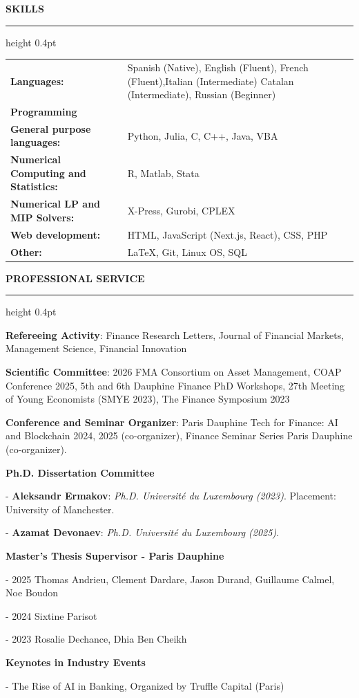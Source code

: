 \documentclass[11pt,letterpaper]{article}
\makeatletter
\newcommand{\cvsection}[1]{%
  \par\vspace{12.80pt}%
  \textbf{#1}\par\nobreak
  \vspace{6.08pt}\hrule height 0.4pt\nobreak\vspace{6.9pt}\nobreak}
\newenvironment{cvbody}
  {\begin{list}{}{%
      \@beginparpenalty\@M      %
      \setlength{\leftmargin}{1.5em}%
      \setlength{\rightmargin}{0pt}%
      \setlength{\labelwidth}{0pt}%
      \setlength{\labelsep}{0pt}%
      \setlength{\listparindent}{0pt}%
      \setlength{\itemindent}{0pt}%
      \setlength{\topsep}{0pt}%
      \setlength{\partopsep}{0pt}%
      \setlength{\parsep}{0pt}%
      \setlength{\itemsep}{0pt}}%
   \item\relax}
  {\end{list}}
\makeatother
\begin{document}
\cvsection{SKILLS}
\begin{cvbody}
\begin{tabular}{@{}p{203pt}@{}p{311pt}@{}}
\textbf{Languages:} & Spanish (Native), English (Fluent), French (Fluent),\newline Italian (Intermediate) Catalan (Intermediate), Russian (Beginner)\\
\textbf{Programming} & \\
\textbf{General purpose languages:} & Python, Julia, C, C++, Java, VBA\\
\textbf{Numerical Computing and Statistics:} & R, Matlab, Stata\\
\textbf{Numerical LP and MIP Solvers:} & X-Press, Gurobi, CPLEX\\
\textbf{Web development:} & HTML, JavaScript (Next.js, React), CSS, PHP\\
\textbf{Other:} & \LaTeX, Git, Linux OS, SQL\\
\end{tabular}
\end{cvbody}

\cvsection{PROFESSIONAL SERVICE}
\begin{cvbody}
\textbf{Refereeing Activity}: Finance Research Letters, Journal of Financial Markets, Management Science, Financial Innovation\par
\textbf{Scientific Committee}: 2026 FMA Consortium on Asset Management, COAP Conference 2025, 5th and 6th Dauphine Finance PhD Workshops, 27th Meeting of Young Economists (SMYE 2023), The Finance Symposium 2023\par
\textbf{Conference and Seminar Organizer}: Paris Dauphine Tech for Finance: AI and Blockchain 2024, 2025 (co-organizer), Finance Seminar Series Paris Dauphine (co-organizer).\par
\textbf{Ph.D. Dissertation Committee}\par
- \textbf{Aleksandr Ermakov}: \textit{Ph.D. Université du Luxembourg (2023)}. Placement: University of Manchester.\par
- \textbf{Azamat Devonaev}: \textit{Ph.D. Université du Luxembourg (2025)}.\par
\textbf{Master's Thesis Supervisor - Paris Dauphine}\par
- 2025 Thomas Andrieu, Clement Dardare, Jason Durand, Guillaume Calmel, Noe Boudon\par
- 2024 Sixtine Parisot\par
- 2023 Rosalie Dechance, Dhia Ben Cheikh\par
\textbf{Keynotes in Industry Events}\par
- The Rise of AI in Banking, Organized by Truffle Capital (Paris)\par
\end{cvbody}
\end{document}
